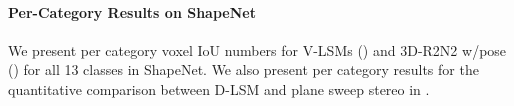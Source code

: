 \paragraph{Per-Category Results on ShapeNet}
We present per category voxel IoU numbers for V-LSMs () and 3D-R2N2 w/pose () for all 13 classes in ShapeNet. We also present per category results for the quantitative comparison between D-LSM and plane sweep stereo in .



